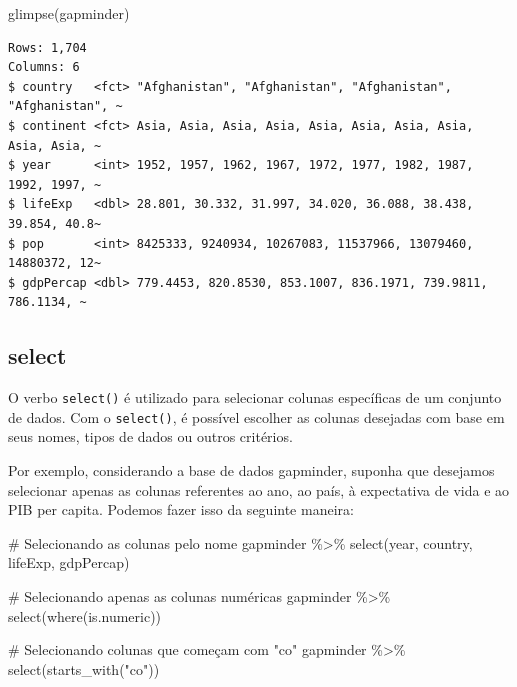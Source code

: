 \documentclass[
  portuguese,
  letterpaper,
  DIV=11,
  numbers=noendperiod]{scrreprt}
\newenvironment{Shaded}{\begin{snugshade}}{\end{snugshade}}
\newcommand{\CommentTok}[1]{\textcolor[rgb]{0.37,0.37,0.37}{#1}}
\newcommand{\FunctionTok}[1]{\textcolor[rgb]{0.28,0.35,0.67}{#1}}
\newcommand{\NormalTok}[1]{\textcolor[rgb]{0.00,0.23,0.31}{#1}}
\newcommand{\SpecialCharTok}[1]{\textcolor[rgb]{0.37,0.37,0.37}{#1}}
\newcommand{\StringTok}[1]{\textcolor[rgb]{0.13,0.47,0.30}{#1}}
\theoremstyle{definition}
\theoremstyle{remark}
\begin{document}
\begin{Shaded}
\begin{Highlighting}[]
\FunctionTok{glimpse}\NormalTok{(gapminder)}
\end{Highlighting}
\end{Shaded}

\begin{verbatim}
Rows: 1,704
Columns: 6
$ country   <fct> "Afghanistan", "Afghanistan", "Afghanistan", "Afghanistan", ~
$ continent <fct> Asia, Asia, Asia, Asia, Asia, Asia, Asia, Asia, Asia, Asia, ~
$ year      <int> 1952, 1957, 1962, 1967, 1972, 1977, 1982, 1987, 1992, 1997, ~
$ lifeExp   <dbl> 28.801, 30.332, 31.997, 34.020, 36.088, 38.438, 39.854, 40.8~
$ pop       <int> 8425333, 9240934, 10267083, 11537966, 13079460, 14880372, 12~
$ gdpPercap <dbl> 779.4453, 820.8530, 853.1007, 836.1971, 739.9811, 786.1134, ~
\end{verbatim}

\subsection{select}\label{select}

O verbo \texttt{select()} é utilizado para selecionar colunas
específicas de um conjunto de dados. Com o \texttt{select()}, é possível
escolher as colunas desejadas com base em seus nomes, tipos de dados ou
outros critérios.

Por exemplo, considerando a base de dados gapminder, suponha que
desejamos selecionar apenas as colunas referentes ao ano, ao país, à
expectativa de vida e ao PIB per capita. Podemos fazer isso da seguinte
maneira:

\begin{Shaded}
\begin{Highlighting}[]
\CommentTok{\# Selecionando as colunas pelo nome}
\NormalTok{gapminder }\SpecialCharTok{\%\textgreater{}\%}
  \FunctionTok{select}\NormalTok{(year, country, lifeExp, gdpPercap)}

\CommentTok{\# Selecionando apenas as colunas numéricas}
\NormalTok{gapminder }\SpecialCharTok{\%\textgreater{}\%} 
  \FunctionTok{select}\NormalTok{(}\FunctionTok{where}\NormalTok{(is.numeric))}

\CommentTok{\# Selecionando colunas que começam com "co"}
\NormalTok{gapminder }\SpecialCharTok{\%\textgreater{}\%} 
  \FunctionTok{select}\NormalTok{(}\FunctionTok{starts\_with}\NormalTok{(}\StringTok{"co"}\NormalTok{))}
\end{Highlighting}
\end{Shaded}
\end{document}
